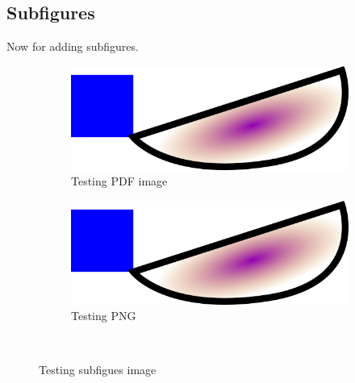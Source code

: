 \documentclass[float=false, crop=false]{standalone}
\begin{document}
\subsection{Subfigures}
Now for adding subfigures.
\begin{figure}
    \centering
    \begin{subfigure}[h!]{0.5\linewidth}
        \includegraphics[width=\textwidth]{./img/rect10.png}
        \caption{Testing PDF image}
        \label{fig:pdftest}
    \end{subfigure}
    \begin{subfigure}[h!]{0.49\linewidth}
        \includegraphics[width=\textwidth]{./img/rect10.png}
        \caption{Testing PNG}
        \label{fig:pngtest}
    \end{subfigure}
    ~ %
    \caption{Testing subfigues image}
    \label{fig:pdftest}
\end{figure}
\end{document}
